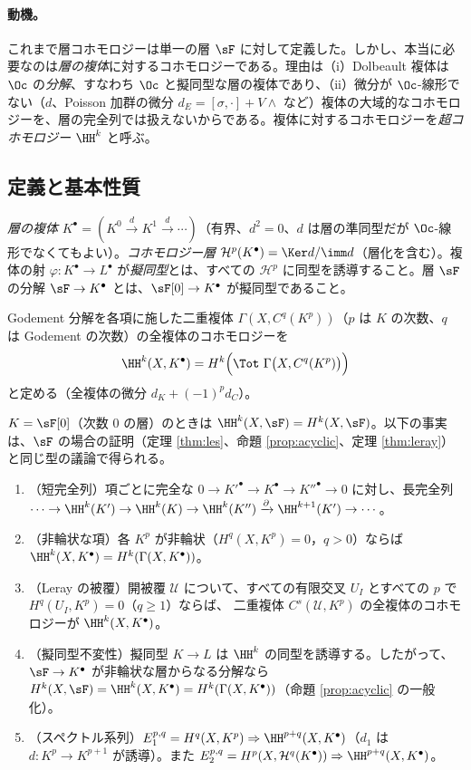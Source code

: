 \paragraph{動機。}これまで層コホモロジーは単一の層 $\sF$ に対して定義した。しかし、本当に必要なのは\emph{層の複体}に対するコホモロジーである。理由は（i）Dolbeault 複体は $\Oc$ の\emph{分解}、すなわち $\Oc$ と擬同型な層の複体であり、（ii）微分が $\Oc$-線形でない（$d$、Poisson 加群の微分 $d_E=[\sigma,\cdot]+V\wedge$ など）複体の大域的なコホモロジーを、層の完全列では扱えないからである。複体に対するコホモロジーを\emph{超コホモロジー} $\HH^k$ と呼ぶ。

\subsection{定義と基本性質}
\begin{defn}
\emph{層の複体} $K^\bullet=(K^0\xrightarrow{d}K^1\xrightarrow{d}\cdots)$（有界、$d^2=0$、$d$ は層の準同型だが $\Oc$-線形でなくてもよい）。\emph{コホモロジー層} $\mathcal H^p(K^\bullet)=\Ker d/\imm d$（層化を含む）。複体の射 $\varphi:K^\bullet\to L^\bullet$ が\emph{擬同型}とは、すべての $\mathcal H^p$ に同型を誘導すること。層 $\sF$ の分解 $\sF\to K^\bullet$ とは、$\sF[0]\to K^\bullet$ が擬同型であること。
\end{defn}
\begin{defn}[超コホモロジー]\label{def:hyper}
Godement 分解を各項に施した二重複体 $\Gamma(X,C^q(K^p))$（$p$ は $K$ の次数、$q$ は Godement の次数）の全複体のコホモロジーを
\[
\HH^k(X,K^\bullet)=H^k\Big(\Tot\ \Gamma\big(X,C^q(K^p)\big)\Big)
\]
と定める（全複体の微分 $d_K+(-1)^p d_C$）。
\end{defn}
$K=\sF[0]$（次数 $0$ の層）のときは $\HH^k(X,\sF)=H^k(X,\sF)$。以下の事実は、$\sF$ の場合の証明（定理 \ref{thm:les}、命題 \ref{prop:acyclic}、定理 \ref{thm:leray}）と同じ型の議論で得られる。
\begin{prop}\label{prop:hyperfacts}
\begin{enumerate}
\item[(a)]\tP（短完全列）項ごとに完全な $0\to K'^\bullet\to K^\bullet\to K''^\bullet\to0$ に対し、長完全列 $\cdots\to\HH^k(K')\to\HH^k(K)\to\HH^k(K'')\xrightarrow{\partial}\HH^{k+1}(K')\to\cdots$。
\item[(b)]\tP（非輪状な項）各 $K^p$ が非輪状（$H^q(X,K^p)=0$，$q>0$）ならば $\HH^k(X,K^\bullet)=H^k(\Gamma(X,K^\bullet))$。
\item[(c)]\tP（Leray の被覆）開被覆 $\mathcal U$ について、すべての有限交叉 $U_I$ とすべての $p$ で $H^q(U_I,K^p)=0$（$q\ge1$）ならば、\Cech{} 二重複体 $C^s(\mathcal U,K^p)$ の全複体のコホモロジーが $\HH^k(X,K^\bullet)$。
\item[(d)]\tC（擬同型不変性）擬同型 $K\to L$ は $\HH^k$ の同型を誘導する。したがって、$\sF\to K^\bullet$ が非輪状な層からなる分解なら $H^k(X,\sF)=\HH^k(X,K^\bullet)=H^k(\Gamma(X,K^\bullet))$（命題 \ref{prop:acyclic} の一般化）。
\item[(e)]\tC（スペクトル系列）$E_1^{p,q}=H^q(X,K^p)\Rightarrow\HH^{p+q}(X,K^\bullet)$（$d_1$ は $d:K^p\to K^{p+1}$ が誘導）。また $E_2^{p,q}=H^p(X,\mathcal H^q(K^\bullet))\Rightarrow\HH^{p+q}(X,K^\bullet)$。
\end{enumerate}
\end{prop}
